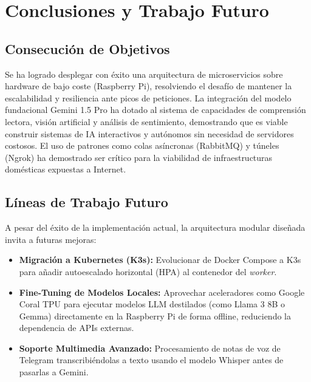 \section{Conclusiones y Trabajo Futuro}
\label{sec:conclusiones}

\subsection{Consecución de Objetivos}
Se ha logrado desplegar con éxito una arquitectura de microservicios sobre hardware de bajo coste (Raspberry Pi), resolviendo el desafío de mantener la escalabilidad y resiliencia ante picos de peticiones. La integración del modelo fundacional Gemini 1.5 Pro ha dotado al sistema de capacidades de comprensión lectora, visión artificial y análisis de sentimiento, demostrando que es viable construir sistemas de IA interactivos y autónomos sin necesidad de servidores costosos.
El uso de patrones como colas asíncronas (RabbitMQ) y túneles (Ngrok) ha demostrado ser crítico para la viabilidad de infraestructuras domésticas expuestas a Internet.

\subsection{Líneas de Trabajo Futuro}
A pesar del éxito de la implementación actual, la arquitectura modular diseñada invita a futuras mejoras:
\begin{itemize}
    \item \textbf{Migración a Kubernetes (K3s):} Evolucionar de Docker Compose a K3s para añadir autoescalado horizontal (HPA) al contenedor del \textit{worker}.
    \item \textbf{Fine-Tuning de Modelos Locales:} Aprovechar aceleradores como Google Coral TPU para ejecutar modelos LLM destilados (como Llama 3 8B o Gemma) directamente en la Raspberry Pi de forma offline, reduciendo la dependencia de APIs externas.
    \item \textbf{Soporte Multimedia Avanzado:} Procesamiento de notas de voz de Telegram transcribiéndolas a texto usando el modelo Whisper antes de pasarlas a Gemini.
\end{itemize}
